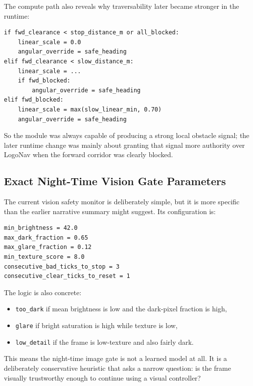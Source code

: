\documentclass[11pt]{article}
\begin{document}
The compute path also reveals why traversability later became stronger in the runtime:
\begin{verbatim}
if fwd_clearance < stop_distance_m or all_blocked:
    linear_scale = 0.0
    angular_override = safe_heading
elif fwd_clearance < slow_distance_m:
    linear_scale = ...
    if fwd_blocked:
        angular_override = safe_heading
elif fwd_blocked:
    linear_scale = max(slow_linear_min, 0.70)
    angular_override = safe_heading
\end{verbatim}

So the module was always capable of producing a strong local obstacle signal; the later runtime change was mainly about granting that signal more authority over LogoNav when the forward corridor was clearly blocked.

\subsection{Exact Night-Time Vision Gate Parameters}
The current vision safety monitor is deliberately simple, but it is more specific than the earlier narrative summary might suggest. Its configuration is:
\begin{verbatim}
min_brightness = 42.0
max_dark_fraction = 0.65
max_glare_fraction = 0.12
min_texture_score = 8.0
consecutive_bad_ticks_to_stop = 3
consecutive_clear_ticks_to_reset = 1
\end{verbatim}

The logic is also concrete:
\begin{itemize}[leftmargin=*]
\item \texttt{too\_dark} if mean brightness is low and the dark-pixel fraction is high,
\item \texttt{glare} if bright saturation is high while texture is low,
\item \texttt{low\_detail} if the frame is low-texture and also fairly dark.
\end{itemize}

This means the night-time image gate is not a learned model at all. It is a deliberately conservative heuristic that asks a narrow question: is the frame visually trustworthy enough to continue using a visual controller?
\end{document}
